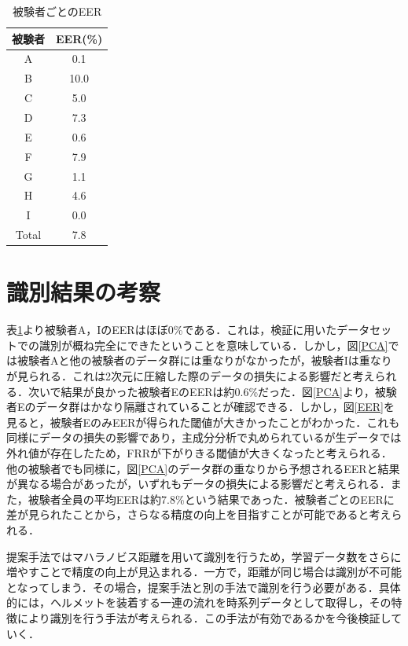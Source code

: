 \begin{table}[htb]
  \centering
  \caption{被験者ごとのEER}
  \begin{tabular}{|c|c|} \hline
    被験者 & EER(\%) \\ \hline \hline
    A & 0.1 \\
    B & 10.0 \\
    C & 5.0 \\
    D & 7.3 \\
    E & 0.6 \\
    F & 7.9 \\
    G & 1.1 \\
    H & 4.6 \\
    I & 0.0 \\ \hline
    Total & 7.8 \\ \hline
  \end{tabular}
  \label{EER_num}
\end{table}

\section{識別結果の考察}
表\ref{EER_num}より被験者A，IのEERはほぼ0\%である．これは，検証に用いたデータセットでの識別が概ね完全にできたということを意味している．しかし，図\ref{PCA}では被験者Aと他の被験者のデータ群には重なりがなかったが，被験者Iは重なりが見られる．これは2次元に圧縮した際のデータの損失による影響だと考えられる．次いで結果が良かった被験者EのEERは約0.6\%だった．図\ref{PCA}より，被験者Eのデータ群はかなり隔離されていることが確認できる．しかし，図\ref{EER}を見ると，被験者EのみEERが得られた閾値が大きかったことがわかった．これも同様にデータの損失の影響であり，主成分分析で丸められているが生データでは外れ値が存在したため，FRRが下がりきる閾値が大きくなったと考えられる．他の被験者でも同様に，図\ref{PCA}のデータ群の重なりから予想されるEERと結果が異なる場合があったが，いずれもデータの損失による影響だと考えられる．また，被験者全員の平均EERは約7.8\%という結果であった．被験者ごとのEERに差が見られたことから，さらなる精度の向上を目指すことが可能であると考えられる．\par
提案手法ではマハラノビス距離を用いて識別を行うため，学習データ数をさらに増やすことで精度の向上が見込まれる．一方で，距離が同じ場合は識別が不可能となってしまう．その場合，提案手法と別の手法で識別を行う必要がある．具体的には，ヘルメットを装着する一連の流れを時系列データとして取得し，その特徴により識別を行う手法が考えられる．この手法が有効であるかを今後検証していく．